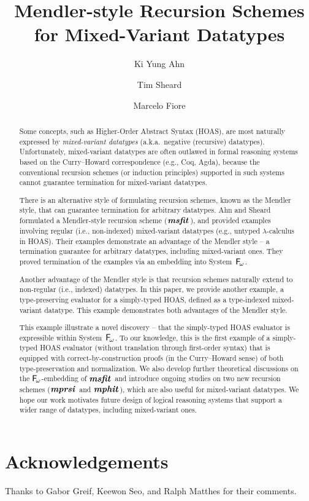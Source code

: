 \documentclass[a4paper,UKenglish]{lipics}
\title{Mendler-style Recursion Schemes for Mixed-Variant Datatypes
	}
\author[1]{Ki Yung Ahn}
\author[1]{Tim Sheard}
\author[2]{Marcelo Fiore}
\affil[1]{Department of Computer Science, Portland State University\\
  Oregon, USA\\
  \texttt{\{kya,sheard\}@cs.pdx.edu}}
\affil[2]{Computer Laboratory, University of Cambridge\\
  Cambridge, UK\\
  \texttt{Marcelo.Fiore@cl.cam.ac.uk}}
\newcommand{\eg}[0]{{e.g.}}
\newcommand{\ie}[0]{{i.e.}}
\newcommand{\aka}[0]{{a.k.a.}}
\newcommand{\Fw}[0]{{\ensuremath{\mathsf{\uppercase{F}}_{\!\omega}}}}
\newcommand{\msfit}[1]{\ensuremath{\textbf{\textit{msfit}}_{#1}}}
\newcommand{\mprsi}[1]{\ensuremath{\textbf{\textit{mprsi}}_{#1}}}
\newcommand{\mphit}[1]{\ensuremath{\textbf{\textit{mphit}}_{#1}}}
\begin{document}
\maketitle

\begin{abstract}
Some concepts, such as Higher-Order Abstract Syntax (HOAS),
are most naturally expressed by \emph{mixed-variant datatypes}
(\aka\ negative (recursive) datatypes). Unfortunately,
mixed-variant datatypes are often outlawed in formal reasoning systems
based on the Curry--Howard correspondence (\eg, Coq, Agda), because
the conventional recursion schemes (or induction principles) supported in
such systems cannot guarantee termination for mixed-variant datatypes.

There is an alternative style of formulating recursion schemes,
known as the Mendler style, that can guarantee termination for
arbitrary datatypes. Ahn and Sheard \cite{AhnShe11} formulated
a Mendler-style recursion scheme (\msfit{}), and provided
examples involving regular (\ie, non-indexed) mixed-variant datatypes
(\eg, untyped $\lambda$-calculus in HOAS). Their examples demonstrate
an advantage of the Mendler style -- a termination guarantee for
arbitrary datatypes, including mixed-variant ones. They proved
termination of the examples via an embedding into System~\Fw.

Another advantage of the Mendler style is that recursion schemes
naturally extend to non-regular (\ie, indexed) datatypes. In this paper,
we provide another example, a type-preserving evaluator for a simply-typed HOAS,
defined as a type-indexed mixed-variant datatype. This example demonstrates
both advantages of the Mendler style.

This example illustrate a novel discovery -- that the simply-typed HOAS evaluator
is expressible within System~\Fw. To our knowledge, this is the first example of
a simply-typed HOAS evaluator (without translation through first-order syntax)
that is equipped with correct-by-construction proofs
(in the Curry--Howard sense) of both type-preservation and normalization.
We also develop further theoretical discussions on the \Fw-embedding of \msfit{}
and introduce ongoing studies on two new recursion schemes
(\mprsi{} and \mphit{}), which are also useful for mixed-variant datatypes.
We hope our work motivates future design of
logical reasoning systems that support a wider range of datatypes,
including mixed-variant ones.
\end{abstract}










\section*{Acknowledgements}
Thanks to Gabor Greif, Keewon Seo, and Ralph Matthes for their comments.



\end{document}
